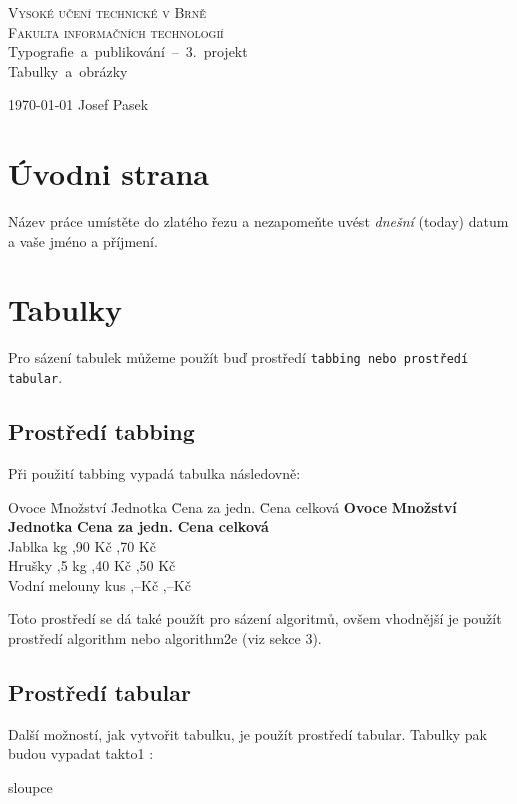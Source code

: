 \documentclass[11pt, a4paper]{article}
\begin{document}
\makeatletter
\begin{titlepage}
	\begin{center}
		{\Huge \textsc{Vysoké učení technické v Brně}} \\[0.5em]
		{\huge \textsc{Fakulta informačních technologií}} \\[0.6em]
		\quad\hbox{\LARGE{Typografie a publikování -- 3. projekt}} \\[0.6em]
		\quad\hbox{\Huge{Tabulky a obrázky}}
	\end{center}
	\begin{flushright}
		{\Large \today} \hfill {\Large Josef Pasek}
	\end{flushright}
\end{titlepage}
\makeatother
\section{Úvodni strana}
Název práce umístěte do zlatého řezu a nezapomeňte uvést \textit{dnešní} (today) datum a vaše jméno a příjmení.
\section{Tabulky}
Pro sázení tabulek můžeme použít buď prostředí \texttt{tabbing nebo prostředí} \texttt{tabular}.
\subsection{Prostředí tabbing}
Při použití tabbing vypadá tabulka následovně:
\begin{tabbing}
	Ovoce \hspace{1.5cm} \= Množství \hspace{0.5cm} \= Jednotka \hspace{0.5cm} \= Cena za jedn. \hspace{0.5cm} \= Cena celková \kill
	\textbf{Ovoce} \> \textbf{Množství} \> \textbf{Jednotka} \> \textbf{Cena za jedn.} \> \textbf{Cena celková} \\
	Jablka  \> kg ,90 Kč ,70 Kč \\
	Hrušky ,5 \> kg ,40 Kč ,50 Kč \\
	Vodní melouny  \> kus ,--Kč ,--Kč \\
\end{tabbing}
Toto prostředí se dá také použít pro sázení algoritmů, ovšem vhodnější je použít prostředí algorithm nebo
algorithm2e (viz sekce 3).
\subsection{Prostředí tabular}
Další možností, jak vytvořit tabulku, je použít prostředí tabular. Tabulky pak budou vypadat takto1 :
\begin{tabular}{sloupce}
\end{tabular}
\end{document}
